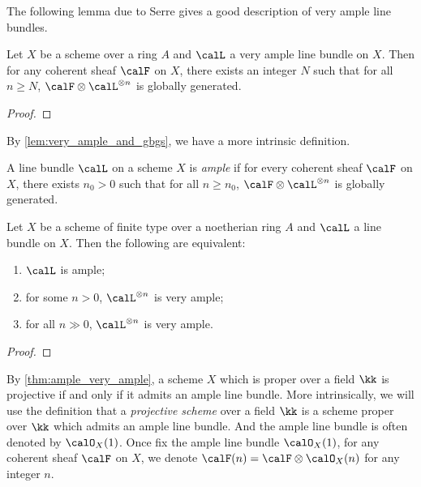     The following lemma due to Serre gives a good description of very ample line bundles.

    \begin{lemma}\label{lem:very_ample_and_gbgs}
        Let \(X\) be a scheme over a ring \(A\) and \(\calL\) a very ample line bundle on \(X\).
        Then for any coherent sheaf \(\calF\) on \(X\), there exists an integer \(N\) such that for all \(n \geq N\), \(\calF \otimes \calL^{\otimes n}\) is globally generated.
    \end{lemma}
    \begin{proof}
    \end{proof}

    By \cref{lem:very_ample_and_gbgs}, we have a more intrinsic definition.

    \begin{definition}\label{def:ample_line_bundle}
        A line bundle \(\calL\) on a scheme \(X\) is \emph{ample} if for every coherent sheaf \(\calF\) on \(X\), 
        there exists \(n_0>0\) such that for all \(n\ge n_0\), \(\calF\otimes \calL^{\otimes n}\) is globally generated.
    \end{definition}
    
    \begin{theorem}\label{thm:ample_very_ample}
        Let \(X\) be a scheme of finite type over a noetherian ring \(A\) and \(\calL\) a line bundle on \(X\).
        Then the following are equivalent:
        \begin{enumerate}
            \item \(\calL\) is ample;
            \item for some \(n>0\), \(\calL^{\otimes n}\) is very ample;
            \item for all \(n \gg 0\), \(\calL^{\otimes n}\) is very ample.
        \end{enumerate}
    \end{theorem}
    \begin{proof}
    \end{proof}

    \begin{remark}\label{rmk:define_projective_variety_by_ample_divisors}
        By \cref{thm:ample_very_ample}, a scheme \(X\) which is proper over a field \(\kk\) is projective if and only if it admits an ample line bundle.
        More intrinsically, we will use the definition that a \emph{projective scheme} over a field \(\kk\) is a scheme proper over \(\kk\) which admits an ample line bundle.
        And the ample line bundle is often denoted by \(\calO_X(1)\).
        Once fix the ample line bundle \(\calO_X(1)\), for any coherent sheaf \(\calF\) on \(X\), we denote \(\calF(n) = \calF \otimes \calO_X(n)\) for any integer \(n\).
    \end{remark}

